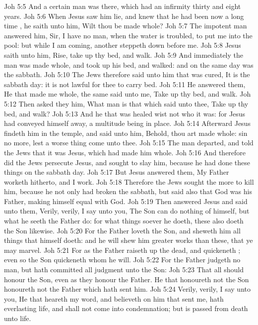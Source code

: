 \vs Joh 5:5 And a certain man was there, which had an infirmity thirty and eight years.
\vs Joh 5:6 When Jesus saw him lie, and knew that he had been now a long time , he saith unto him, Wilt thou be made whole?
\vs Joh 5:7 The impotent man answered him, Sir, I have no man, when the water is troubled, to put me into the pool: but while I am coming, another steppeth down before me.
\vs Joh 5:8 Jesus saith unto him, Rise, take up thy bed, and walk.
\vs Joh 5:9 And immediately the man was made whole, and took up his bed, and walked: and on the same day was the sabbath.
\vs Joh 5:10 The Jews therefore said unto him that was cured, It is the sabbath day: it is not lawful for thee to carry  bed.
\vs Joh 5:11 He answered them, He that made me whole, the same said unto me, Take up thy bed, and walk.
\vs Joh 5:12 Then asked they him, What man is that which said unto thee, Take up thy bed, and walk?
\vs Joh 5:13 And he that was healed wist not who it was: for Jesus had conveyed himself away, a multitude being in  place.
\vs Joh 5:14 Afterward Jesus findeth him in the temple, and said unto him, Behold, thou art made whole: sin no more, lest a worse thing come unto thee.
\vs Joh 5:15 The man departed, and told the Jews that it was Jesus, which had made him whole.
\vs Joh 5:16 And therefore did the Jews persecute Jesus, and sought to slay him, because he had done these things on the sabbath day.
\vs Joh 5:17 But Jesus answered them, My Father worketh hitherto, and I work.
\vs Joh 5:18 Therefore the Jews sought the more to kill him, because he not only had broken the sabbath, but said also that God was his Father, making himself equal with God.
\vs Joh 5:19 Then answered Jesus and said unto them, Verily, verily, I say unto you, The Son can do nothing of himself, but what he seeth the Father do: for what things soever he doeth, these also doeth the Son likewise.
\vs Joh 5:20 For the Father loveth the Son, and sheweth him all things that himself doeth: and he will shew him greater works than these, that ye may marvel.
\vs Joh 5:21 For as the Father raiseth up the dead, and quickeneth ; even so the Son quickeneth whom he will.
\vs Joh 5:22 For the Father judgeth no man, but hath committed all judgment unto the Son:
\vs Joh 5:23 That all  should honour the Son, even as they honour the Father. He that honoureth not the Son honoureth not the Father which hath sent him.
\vs Joh 5:24 Verily, verily, I say unto you, He that heareth my word, and believeth on him that sent me, hath everlasting life, and shall not come into condemnation; but is passed from death unto life.
